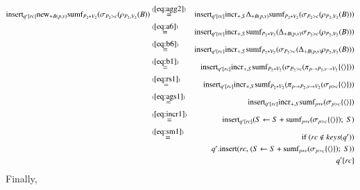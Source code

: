 \documentclass{article}
\newcommand{\tuple}[1]{{\langle#1\rangle}}
\begin{document}
\begin{eqnarray*}
\alginsert_{q'[rc]} \algnew_{+B(p,v)} \algsumf_{P_2 * V_2}(\sigma_{P_2 > c} (\rho_{P_2 , V_2}(B))
&\stackrel{(\ref{eq:agg2})}{=}&
\alginsert_{q'[rc]} \algincr_{+, S} \Delta_{+B(p,v)} \algsumf_{P_2 * V_2}(\sigma_{P_2 > c} (\rho_{P_2 , V_2}(B)))
\\
&\stackrel{(\ref{eq:a6})}{=}&
\alginsert_{q'[rc]} \algincr_{+, S} \algsumf_{P_2 * V_2}(\Delta_{+B(p,v)} \sigma_{P_2 > c} (\rho_{P_2 , V_2}(B)))
\\
&\stackrel{(\ref{eq:b6})}{=}&
\alginsert_{q'[rc]} \algincr_{+, S} \algsumf_{P_2 * V_2}(\sigma_{P_2 > c} (\Delta_{+B(p,v)} \rho_{P_2 , V_2}(B)))
\\
&\stackrel{(\ref{eq:b1})}{=}&
\alginsert_{q'[rc]} \algincr_{+, S} \algsumf_{P_2 * V_2}(\sigma_{P_2 > c} (\pi_{p \rightarrow P_2, v \rightarrow V_2} \{\tuple{}\} ))
\\
&\stackrel{(\ref{eq:rs1})}{=}&
\alginsert_{q'[rc]} \algincr_{+, S} \algsumf_{P_2 * V_2}(\pi_{p \rightarrow P_2, v \rightarrow V_2} (\sigma_{p > c} \{\tuple{}\} ))
\\
&\stackrel{(\ref{eq:ags1})}{=}&
\alginsert_{q'[rc]} \algincr_{+, S} \algsumf_{p * v}(\sigma_{p > c} \{\tuple{}\} )
\\
&\stackrel{(\ref{eq:incr1})}{=}&
\alginsert_{q'[rc]} (S \leftarrow S + \algsumf_{p * v}(\sigma_{p > c} \{\tuple{}\} );\;S)
\\
&\stackrel{(\ref{eq:sm1})}{=}&
\mbox{if ($rc \notin keys(q')$)} \\
&&\quad
\mbox{$q'$.insert($rc$, $(S \leftarrow S + \algsumf_{p * v}(\sigma_{p > c} \{\tuple{}\} );\;S))$}
\\&&q'[rc] 
\\
\end{eqnarray*}
Finally,
\end{document}
